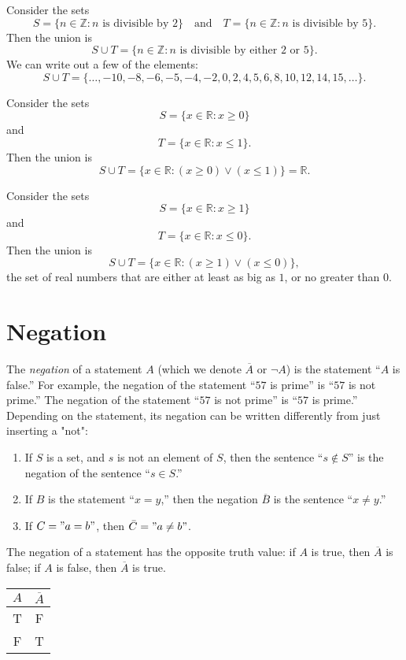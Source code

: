 \documentclass[11pt,dvipsnames]{book}
\numberwithin{figure}{section} %
\numberwithin{table}{section} %
\begin{document}
\begin{example}
Consider the sets
\[
    S = \{n \in \mathbb{Z} : n\text{ is divisible by }2\}\quad \text{and}\quad T = \{n \in \mathbb{Z} : n\text{ is divisible by }5\}.
\]
Then the union is
\[
    S \cup T = \{n \in \mathbb{Z} : n\text{ is divisible by either }2\text{ or }5\}.
\]
We can write out a few of the elements:
\[
    S \cup T =\{\dots,-10,-8,-6,-5,-4,-2,0,2,4,5,6,8,10,12,14,15,\dots\}.
\]
\end{example}

\begin{example}
Consider the sets
\[
    S = \{x \in \mathbb{R} : x \geq 0\}
\]
and
\[
    T = \{x \in \mathbb{R} : x \leq 1\}.
\]
Then the union is
\[
    S \cup T = \{x \in \mathbb{R} : (x \geq 0) \vee (x \leq 1) \} = \mathbb{R}.
\]
\end{example}

\begin{example}
Consider the sets
\[
    S = \{x \in \mathbb{R} : x \geq 1\}
\]
and
\[
    T = \{x \in \mathbb{R} : x \leq 0\}.
\]
Then the union is
\[
    S \cup T = \{x \in \mathbb{R} : (x \geq 1)\vee(x \leq 0) \},
\]
the set of real numbers that are either at least as big as $1$, or no greater than $0$.
\end{example}

\section{Negation}

The \emph{negation} of a statement $A$ (which we denote $\overline{A}$ or $\neg A$) is the statement ``$A$ is false.''
For example, the negation of the statement ``$57$ is prime'' is ``$57$ is not prime.''
The negation of the statement ``$57$ is not prime'' is ``$57$ is prime.''
Depending on the statement, its negation can be written differently from just inserting a "not":
\begin{enumerate}[label=(\alph*)]
\item If $S$ is a set, and $s$ is not an element of $S$, then the sentence ``$s \notin S$'' is the negation of the sentence ``$s \in S$.''
\item If $B$ is the statement ``$x = y$,'' then the negation $\overline{B}$ is the sentence ``$x \neq y$.''
\item If $C="a=b"$, then $\bar{C}="a\neq b"$.
\end{enumerate}

The negation of a statement has the opposite truth value: if $A$ is true, then $\overline{A}$ is false; if $A$ is false, then $\overline{A}$ is true.
\begin{center}
    \begin{tabular}{ c|c}
        $A$ & $\overline{A}$   \\ \hline
        T & F \\
        F & T \\
    \end{tabular}
\end{center}
\end{document}
